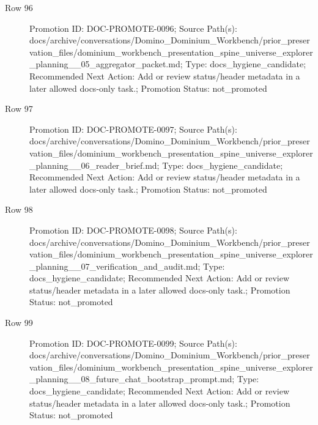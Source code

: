 \documentclass[9pt,a4paper,openany]{book}
\begin{document}
\begin{description}
\item[Row 96] Promotion ID: DOC-\allowbreak{}PROMOTE-\allowbreak{}0096; Source Path(s): docs/\allowbreak{}archive/\allowbreak{}conversations/\allowbreak{}Domino\_\allowbreak{}Dominium\_\allowbreak{}Workbench/\allowbreak{}prior\_\allowbreak{}preservation\_\allowbreak{}files/\allowbreak{}dominium\_\allowbreak{}workbench\_\allowbreak{}presentation\_\allowbreak{}spine\_\allowbreak{}universe\_\allowbreak{}explorer\_\allowbreak{}planning\_\allowbreak{}\_\allowbreak{}05\_\allowbreak{}aggregator\_\allowbreak{}packet.\allowbreak{}md; Type: docs\_\allowbreak{}hygiene\_\allowbreak{}candidate; Recommended Next Action: Add or review status/\allowbreak{}header metadata in a later allowed docs-\allowbreak{}only task.\allowbreak{}; Promotion Status: not\_\allowbreak{}promoted
\item[Row 97] Promotion ID: DOC-\allowbreak{}PROMOTE-\allowbreak{}0097; Source Path(s): docs/\allowbreak{}archive/\allowbreak{}conversations/\allowbreak{}Domino\_\allowbreak{}Dominium\_\allowbreak{}Workbench/\allowbreak{}prior\_\allowbreak{}preservation\_\allowbreak{}files/\allowbreak{}dominium\_\allowbreak{}workbench\_\allowbreak{}presentation\_\allowbreak{}spine\_\allowbreak{}universe\_\allowbreak{}explorer\_\allowbreak{}planning\_\allowbreak{}\_\allowbreak{}06\_\allowbreak{}reader\_\allowbreak{}brief.\allowbreak{}md; Type: docs\_\allowbreak{}hygiene\_\allowbreak{}candidate; Recommended Next Action: Add or review status/\allowbreak{}header metadata in a later allowed docs-\allowbreak{}only task.\allowbreak{}; Promotion Status: not\_\allowbreak{}promoted
\item[Row 98] Promotion ID: DOC-\allowbreak{}PROMOTE-\allowbreak{}0098; Source Path(s): docs/\allowbreak{}archive/\allowbreak{}conversations/\allowbreak{}Domino\_\allowbreak{}Dominium\_\allowbreak{}Workbench/\allowbreak{}prior\_\allowbreak{}preservation\_\allowbreak{}files/\allowbreak{}dominium\_\allowbreak{}workbench\_\allowbreak{}presentation\_\allowbreak{}spine\_\allowbreak{}universe\_\allowbreak{}explorer\_\allowbreak{}planning\_\allowbreak{}\_\allowbreak{}07\_\allowbreak{}verification\_\allowbreak{}and\_\allowbreak{}audit.\allowbreak{}md; Type: docs\_\allowbreak{}hygiene\_\allowbreak{}candidate; Recommended Next Action: Add or review status/\allowbreak{}header metadata in a later allowed docs-\allowbreak{}only task.\allowbreak{}; Promotion Status: not\_\allowbreak{}promoted
\item[Row 99] Promotion ID: DOC-\allowbreak{}PROMOTE-\allowbreak{}0099; Source Path(s): docs/\allowbreak{}archive/\allowbreak{}conversations/\allowbreak{}Domino\_\allowbreak{}Dominium\_\allowbreak{}Workbench/\allowbreak{}prior\_\allowbreak{}preservation\_\allowbreak{}files/\allowbreak{}dominium\_\allowbreak{}workbench\_\allowbreak{}presentation\_\allowbreak{}spine\_\allowbreak{}universe\_\allowbreak{}explorer\_\allowbreak{}planning\_\allowbreak{}\_\allowbreak{}08\_\allowbreak{}future\_\allowbreak{}chat\_\allowbreak{}bootstrap\_\allowbreak{}prompt.\allowbreak{}md; Type: docs\_\allowbreak{}hygiene\_\allowbreak{}candidate; Recommended Next Action: Add or review status/\allowbreak{}header metadata in a later allowed docs-\allowbreak{}only task.\allowbreak{}; Promotion Status: not\_\allowbreak{}promoted

\end{description}
\end{document}
